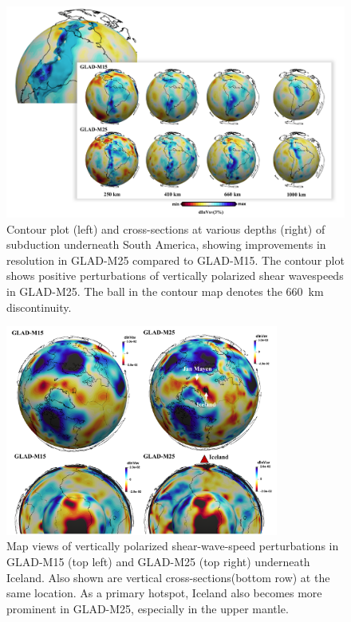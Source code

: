 \documentclass[extra,mreferee]{gji}
\begin{document}
\begin{figure}
\centering
\includegraphics[width=.8\textwidth]{figures/south_america.pdf}
\caption{\small{Contour plot (left) and cross-sections at various depths (right) of subduction underneath South America, showing improvements in resolution in GLAD-M25 compared to GLAD-M15.
The contour plot shows positive perturbations of vertically polarized shear wavespeeds in GLAD-M25. The ball in the contour map denotes the 660~km discontinuity.}}
\label{fig:S_America}
\end{figure}

\begin{figure}
  \centering
  \includegraphics[width=0.8\textwidth]{figures/M25-Iceland.pdf}
  \caption{\small{Map views of vertically polarized shear-wave-speed perturbations in GLAD-M15 (top left) and GLAD-M25 (top right) underneath Iceland. Also shown are vertical cross-sections(bottom row) at the same location. As a primary hotspot, Iceland also becomes more prominent in GLAD-M25, especially in the upper mantle.
  }}
  \label{fig:M24-Iceland}
\end{figure}
\end{document}
